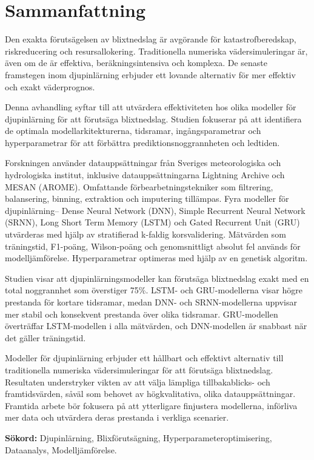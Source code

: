 \chapter*{Sammanfattning}
\label{sec:sammanfattning}

Den exakta förutsägelsen av blixtnedslag är avgörande för katastrofberedskap, riskreducering och resursallokering. Traditionella numeriska vädersimuleringar är, även om de är effektiva, beräkningsintensiva och komplexa. De senaste framstegen inom djupinlärning erbjuder ett lovande alternativ för mer effektiv och exakt väderprognos.

Denna avhandling syftar till att utvärdera effektiviteten hos olika modeller för djupinlärning för att förutsäga blixtnedslag. Studien fokuserar på att identifiera de optimala modellarkitekturerna, tidsramar, ingångsparametrar och hyperparametrar för att förbättra prediktionsnoggrannheten och ledtiden.

Forskningen använder datauppsättningar från Sveriges meteorologiska och hydrologiska institut, inklusive datauppsättningarna Lightning Archive och MESAN (AROME). Omfattande förbearbetningstekniker som filtrering, balansering, binning, extraktion och imputering tillämpas. Fyra modeller för djupinlärning-- Dense Neural Network (DNN), Simple Recurrent Neural Network (SRNN), Long Short Term Memory (LSTM) och Gated Recurrent Unit (GRU) utvärderas med hjälp av stratifierad k-faldig korsvalidering. Mätvärden som träningstid, F1-poäng, Wilson-poäng och genomsnittligt absolut fel används för modelljämförelse. Hyperparametrar optimeras med hjälp av en genetisk algoritm.

Studien visar att djupinlärningsmodeller kan förutsäga blixtnedslag exakt med en total noggrannhet som överstiger 75\%. LSTM- och GRU-modellerna visar högre prestanda för kortare tidsramar, medan DNN- och SRNN-modellerna uppvisar mer stabil och konsekvent prestanda över olika tidsramar. GRU-modellen överträffar LSTM-modellen i alla mätvärden, och DNN-modellen är snabbast när det gäller träningstid.

Modeller för djupinlärning erbjuder ett hållbart och effektivt alternativ till traditionella numeriska vädersimuleringar för att förutsäga blixtnedslag. Resultaten understryker vikten av att välja lämpliga tillbakablicks- och framtidsvärden, såväl som behovet av högkvalitativa, olika datauppsättningar. Framtida arbete bör fokusera på att ytterligare finjustera modellerna, införliva mer data och utvärdera deras prestanda i verkliga scenarier.

\textbf{Sökord:} Djupinlärning, Blixförutsägning, Hyperparameteroptimisering, Dataanalys, Modelljämförelse.
